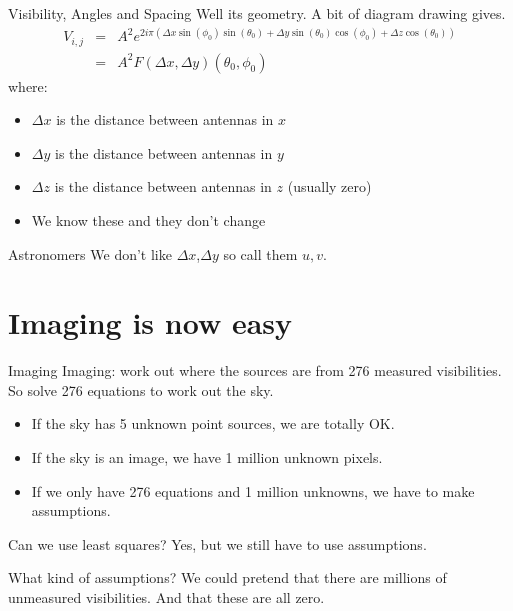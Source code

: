\documentclass[ignorenonframetext]{beamer}
\begin{document}
\begin{frame}
\begin{columns}
\begin{column}{0.7\linewidth}
\begin{center}
  \end{center}
 \end{column}
\end{columns}
\end{frame}


\begin{frame}{Visibility, Angles and Spacing}
Well its geometry. A bit of diagram drawing gives.
 \begin{eqnarray*} V_{i,j} & = & A^2 e^{2 i \pi \left(\Delta x \sin{\left(\phi_{0} \right)} \sin{\left(\theta_{0} \right)} + \Delta y \sin{\left(\theta_{0} \right)} \cos{\left(\phi_{0} \right)} + \Delta z \cos{\left(\theta_{0} \right)}\right)}  \\
 & = & A^2 F(\Delta x, \Delta y)(\theta_0, \phi_0)
 \end{eqnarray*}
 where:
 \begin{itemize}
  \item $\Delta x$ is the distance between antennas in $x$
  \item $\Delta y$ is the distance between antennas in $y$
  \item $\Delta z$ is the distance between antennas in $z$ (usually zero)
  \item We know these and they don't change
 \end{itemize}
 \begin{block}{Astronomers}
  We don't like $\Delta x$,$\Delta y$ so call them $u, v$.
 \end{block}
\end{frame}


\section{Imaging is now easy}

\begin{frame}{Imaging}
 Imaging: work out where the sources are from 276 measured visibilities. So solve 276 equations to work out the sky.
 \begin{itemize}
 \item If the sky has 5 unknown point sources, we are totally OK.
  \item If the sky is an image, we have 1 million unknown pixels.
  \item If we only have 276 equations and 1 million unknowns, we have to make assumptions.
 \end{itemize}
\begin{block}{Can we use least squares?}
 Yes, but we still have to use assumptions.
\end{block}
\begin{block}{What kind of assumptions?}
 We could pretend that there are millions of unmeasured visibilities. And that these are all zero.
\end{block}
\end{frame}
\end{document}
